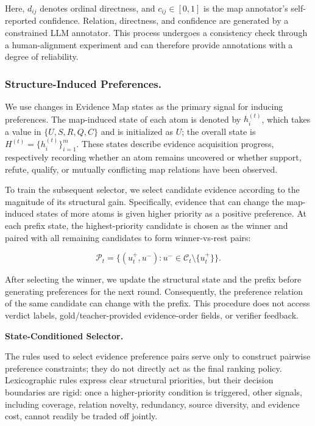 \documentclass[letterpaper]{article}
\begin{document}
Here, $d_{ij}$ denotes ordinal directness, and $c_{ij}\in[0,1]$ is the map annotator's self-reported confidence. Relation, directness, and confidence are generated by a constrained LLM annotator. This process undergoes a consistency check through a human-alignment experiment and can therefore provide annotations with a degree of reliability.

\subsubsection{Structure-Induced Preferences.}

We use changes in Evidence Map states as the primary signal for inducing preferences. The map-induced state of each atom is denoted by $h_i^{(t)}$, which takes a value in $\{U,S,R,Q,C\}$ and is initialized as $U$; the overall state is $H^{(t)}=\{h_i^{(t)}\}_{i=1}^{m}$. These states describe evidence acquisition progress, respectively recording whether an atom remains uncovered or whether support, refute, qualify, or mutually conflicting map relations have been observed.

To train the subsequent selector, we select candidate evidence according to the magnitude of its structural gain. Specifically, evidence that can change the map-induced states of more atoms is given higher priority as a positive preference. At each prefix state, the highest-priority candidate is chosen as the winner and paired with all remaining candidates to form winner-vs-rest pairs:

\[
\mathcal P_t=\{(u_t^+,u^-):u^-\in\mathcal C_t\setminus\{u_t^+\}\}.
\]

After selecting the winner, we update the structural state and the prefix before generating preferences for the next round. Consequently, the preference relation of the same candidate can change with the prefix. This procedure does not access verdict labels, gold/teacher-provided evidence-order fields, or verifier feedback.

\textbf{State-Conditioned Selector.}

The rules used to select evidence preference pairs serve only to construct pairwise preference constraints; they do not directly act as the final ranking policy. Lexicographic rules express clear structural priorities, but their decision boundaries are rigid: once a higher-priority condition is triggered, other signals, including coverage, relation novelty, redundancy, source diversity, and evidence cost, cannot readily be traded off jointly.
\end{document}
